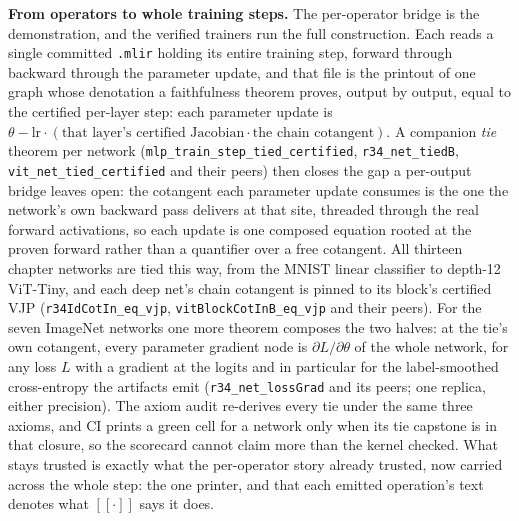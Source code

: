 \medskip\noindent\textbf{From operators to whole training steps.} The
per-operator bridge is the demonstration, and the verified trainers run the
full construction. Each reads a single committed \texttt{.mlir} holding its
entire training step, forward through backward through the parameter update,
and that file is the printout of one graph whose denotation a faithfulness theorem
proves, output by output, equal to the certified per-layer step: each parameter
update is $\theta - \mathrm{lr} \cdot (\text{that layer's certified Jacobian}
\cdot \text{the chain cotangent})$. A companion
\emph{tie} theorem per network (\texttt{mlp\_train\_step\_tied\_certified},
\texttt{r34\_net\_tiedB}, \texttt{vit\_net\_tied\_certified} and their peers) then
closes the gap a per-output bridge leaves open: the cotangent each parameter
update consumes is the one the network's own backward pass delivers at
that site, threaded through the real forward activations, so each update is
one composed equation rooted at the proven forward rather than a quantifier
over a free cotangent. All thirteen chapter networks are tied this way, from the MNIST
linear classifier to depth-12 ViT-Tiny, and each deep net's chain cotangent
is pinned to its block's certified VJP
(\texttt{r34IdCotIn\_eq\_vjp}, \texttt{vitBlockCotInB\_eq\_vjp} and their peers).
For the seven ImageNet networks one more theorem composes the two halves: at
the tie's own cotangent, every parameter gradient node is
$\partial L/\partial\theta$ of the whole network, for any loss $L$ with a
gradient at the logits and in particular for the label-smoothed cross-entropy
the artifacts emit (\texttt{r34\_net\_lossGrad} and its peers; one replica,
either precision). The axiom
audit re-derives every tie under the same three axioms, and CI prints a green
cell for a network only when its tie capstone is in that closure, so the
scorecard cannot claim more than the kernel checked. What stays trusted is
exactly what the per-operator story already trusted, now carried across the
whole step: the one printer, and that each emitted operation's text denotes
what $[\![\cdot]\!]$ says it does.

